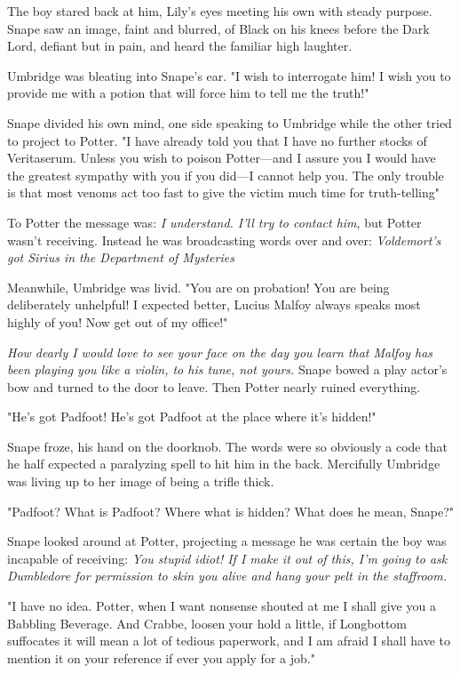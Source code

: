 The boy stared back at him, Lily's eyes meeting his own with steady purpose. Snape saw an image, faint and blurred, of Black on his knees before the Dark Lord, defiant but in pain, and heard the familiar high laughter.

Umbridge was bleating into Snape's ear. "I wish to interrogate him! I wish you to provide me with a potion that will force him to tell me the truth!"

Snape divided his own mind, one side speaking to Umbridge while the other tried to project to Potter. "I have already told you that I have no further stocks of Veritaserum. Unless you wish to poison Potter—and I assure you I would have the greatest sympathy with you if you did—I cannot help you. The only trouble is that most venoms act too fast to give the victim much time for truth-telling{\el}"

To Potter the message was: \emph{I understand. I'll try to contact him}, but Potter wasn't receiving. Instead he was broadcasting words over and over: \emph{Voldemort's got Sirius in the Department of Mysteries{\el}}

Meanwhile, Umbridge was livid. "You are on probation! You are being deliberately unhelpful! I expected better, Lucius Malfoy always speaks most highly of you! Now get out of my office!"

\emph{How dearly I would love to see your face on the day you learn that Malfoy has been playing you like a violin, to his tune, not yours.} Snape bowed a play actor's bow and turned to the door to leave. Then Potter nearly ruined everything.

"He's got Padfoot! He's got Padfoot at the place where it's hidden!"

Snape froze, his hand on the doorknob. The words were so obviously a code that he half expected a paralyzing spell to hit him in the back. Mercifully Umbridge was living up to her image of being a trifle thick.

"Padfoot? What is Padfoot? Where what is hidden? What does he mean, Snape?"

Snape looked around at Potter, projecting a message he was certain the boy was incapable of receiving: \emph{You stupid idiot! If I make it out of this, I'm going to ask Dumbledore for permission to skin you alive and hang your pelt in the staffroom.}

"I have no idea. Potter, when I want nonsense shouted at me I shall give you a Babbling Beverage. And Crabbe, loosen your hold a little, if Longbottom suffocates it will mean a lot of tedious paperwork, and I am afraid I shall have to mention it on your reference if ever you apply for a job."

